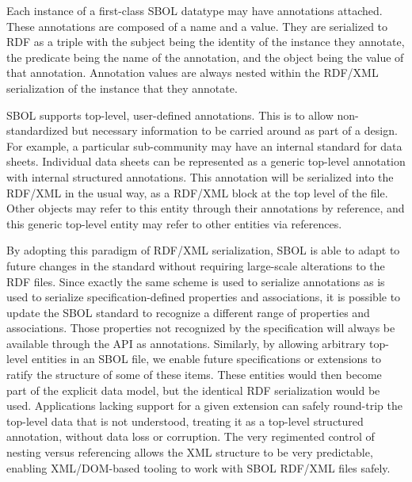 Each instance of a first-class SBOL datatype may have annotations attached. These annotations are composed of a name and a value.  They are serialized to RDF as a triple with the subject being the identity of the instance they annotate, the predicate being the name of the annotation, and the object being the value of that annotation. Annotation values are always nested within the RDF/XML serialization of the instance that they annotate.

SBOL supports top-level, user-defined annotations. This is to allow non-standardized but necessary information to be carried around as part of a design. For example, a particular sub-community may have an internal standard for data sheets. Individual data sheets can be represented as a generic top-level annotation with internal structured annotations. This annotation will be serialized into the RDF/XML in the usual way, as a RDF/XML block at the top level of the file. Other objects may refer to this entity through their annotations by reference, and this generic top-level entity may refer to other entities via references.

By adopting this paradigm of RDF/XML serialization, SBOL is able to adapt to future changes in the standard without requiring large-scale alterations to the RDF files. Since exactly the same scheme is used to serialize annotations as is used to serialize specification-defined properties and associations, it is possible to update the SBOL standard to recognize a different range of properties and associations. Those properties not recognized by the specification will always be available through the API as annotations. Similarly, by allowing arbitrary top-level entities in an SBOL file, we enable future specifications or extensions to ratify the structure of some of these items. These entities would then become part of the explicit data model, but the identical RDF serialization would be used. Applications lacking support for a given extension can safely round-trip the top-level data that is not understood, treating it as a top-level structured annotation, without data loss or corruption. The very regimented control of nesting versus referencing allows the XML structure to be very predictable, enabling XML/DOM-based tooling to work with SBOL RDF/XML files safely.
